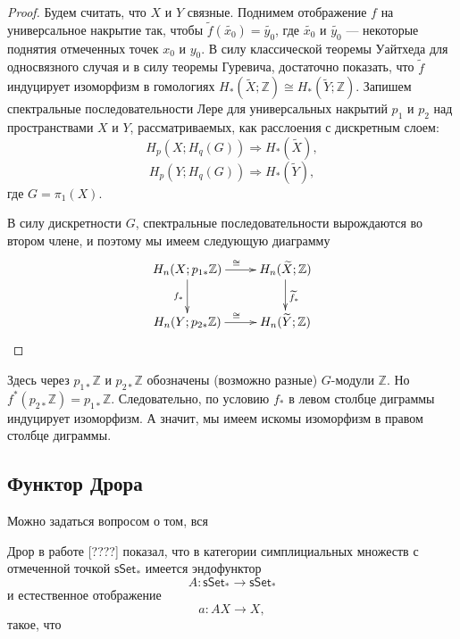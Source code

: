 \documentclass[14pt, dvipsnames]{extarticle}
\theoremstyle{definition}
\theoremstyle{remark}
\begin{document}
\begin{proof}
Будем считать, что $X$ и $Y$ связные. Поднимем отображение $f$ на универсальное накрытие так, чтобы $\widetilde{f}(\widetilde{x_0}) = \widetilde{y_0}$, где $\widetilde{x_0}$ и $\widetilde{y_0}$ --- некоторые поднятия отмеченных точек $x_0$ и $y_0$. В силу классической теоремы Уайтхеда для односвязного случая и в силу теоремы Гуревича, достаточно показать, что $\widetilde{f}$ индуцирует изоморфизм в гомологиях $H_\ast(\widetilde{X}; \mathbb{Z})\cong H_\ast(\widetilde{Y}; \mathbb{Z})$. Запишем спектральные последовательности Лере для универсальных накрытий $p_1$ и $p_2$ над пространствами $X$ и $Y$, рассматриваемых, как расслоения с дискретным слоем: $$H_p(X; H_q(G))\Rightarrow H_\ast(\widetilde{X}),$$ $$H_p(Y; H_q(G))\Rightarrow H_\ast(\widetilde{Y}),$$ где $G = \pi_1(X)$. 

В силу дискретности $G$, спектральные последовательности вырождаются во втором члене, и поэтому мы имеем следующую диаграмму $$\xymatrix{
    H_n(X; p_{1\ast}\mathbb{Z}) \ar[r]^{\cong} \ar[d]_{f_\ast} & H_n(\widetilde{X}; \mathbb{Z}) \ar[d]^{\widetilde{f}_\ast} \\
    H_n(Y; p_{2\ast}\mathbb{Z}) \ar[r]^{\cong}       & H_n(\widetilde{Y}; \mathbb{Z}) }$$    
\end{proof}

Здесь через $p_{1\ast}\mathbb{Z}$ и $p_{2\ast}\mathbb{Z}$ обозначены (возможно разные) $G$-модули $\mathbb{Z}$. Но $f^\ast (p_{2\ast}\mathbb{Z}) = p_{1\ast}\mathbb{Z}$. Следовательно, по условию $f_\ast$ в левом столбце диграммы индуцирует изоморфизм. А значит, мы имеем искомы изоморфизм в правом столбце диграммы. 



\subsection{Функтор Дрора}

Можно задаться вопросом о том, вся




Дрор в работе [????] показал, что в категории симплициальных множеств с отмеченной точкой $\mathsf{sSet}_\ast$ имеется эндофунктор $$A: \mathsf{sSet}_\ast \to \mathsf{sSet}_\ast$$ и естественное отображение $$a: AX\to X,$$ такое, что 
\end{document}

